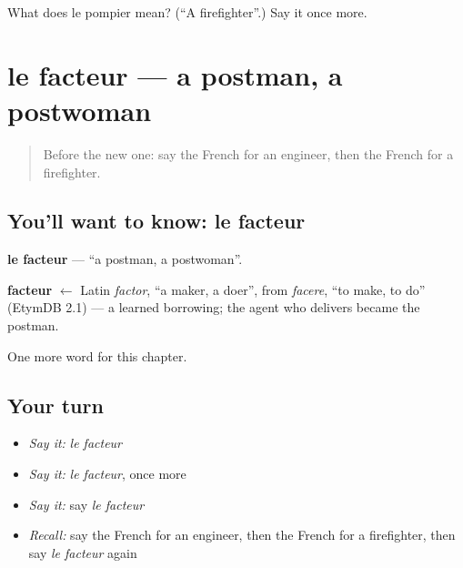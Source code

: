 \begin{tcolorbox}[breakable,colback=teal!4,colframe=teal!35!black,title={Before you move on}]
What does le pompier mean? (\textquotedblleft{}A firefighter\textquotedblright{}.) Say it once more.
\end{tcolorbox}
\section[le facteur]{le facteur — a postman, a postwoman}

\label{lesson:FR-C125-facteur}



\begin{quote}
Before the new one: say the French for an engineer, then the French for a firefighter.
\end{quote}

\subsection*{You'll want to know: le facteur}
\textbf{le facteur} — \textquotedblleft{}a postman, a postwoman\textquotedblright{}.

\begin{cousinweb}
\textbf{facteur} $\leftarrow$ Latin \emph{factor}, \textquotedblleft{}a maker, a doer\textquotedblright{}, from \emph{facere}, \textquotedblleft{}to make, to do\textquotedblright{} (EtymDB 2.1) — a learned borrowing; the agent who delivers became the postman.
\end{cousinweb}

\begin{grammarlens}[title={What you've built}]
One more word for this chapter.
\end{grammarlens}

\subsection*{Your turn}
\begin{itemize}
\raggedright
  \item \emph{Say it:} \emph{le facteur}
  \item \emph{Say it:} \emph{le facteur}, once more
  \item \emph{Say it:} say \emph{le facteur}
  \item \emph{Recall:} say the French for an engineer, then the French for a firefighter, then say \emph{le facteur} again
\end{itemize}

